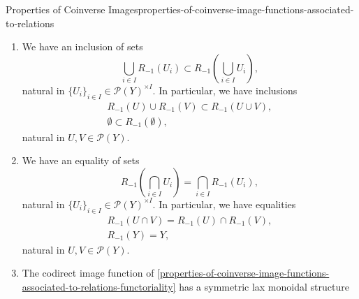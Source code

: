 \begin{proposition}{Properties of Coinverse Images}{properties-of-coinverse-image-functions-associated-to-relations}
\begin{enumerate}
            witnessed by a bijections of sets
            \[%
                \Hom_{\mathcal{P}(X)}(R_{!}(U),V)%
                \cong%
                \Hom_{\mathcal{P}(X)}(U,R_{-1}(V)),%
            \]%
            natural in $U\in\mathcal{P}(X)$ and $V\in\mathcal{P}(Y)$, i.e.\ such that:
            \begin{itemize}
                \itemstar The following conditions are equivalent:
                    \begin{itemize}
                        \item We have $R_{!}(U)\subset V$.
                        \item We have $U\subset R_{-1}(V)$.
                    \end{itemize}
            \end{itemize}
        \item\label{properties-of-coinverse-image-functions-associated-to-relations-lax-preservation-of-colimits}We have an inclusion of sets
            \[
                \bigcup_{i\in I}R_{-1}(U_{i})%
                \subset%
                R_{-1}(\bigcup_{i\in I}U_{i}),%
            \]%
            natural in $\{U_{i}\}_{i\in I}\in\mathcal{P}(Y)^{\times I}$. In particular, we have inclusions%
            \[
                \begin{gathered}
                    R_{-1}(U)\cup R_{-1}(V) \subset R_{-1}(U\cup V),\\
                    \emptyset               \subset R_{-1}(\emptyset),
                \end{gathered}
            \]%
            natural in $U,V\in\mathcal{P}(Y)$.
        \item\label{properties-of-coinverse-image-functions-associated-to-relations-preservation-of-limits}We have an equality of sets
            \[
                    R_{-1}(\bigcap_{i\in I}U_{i})%
                    =%
                    \bigcap_{i\in I}R_{-1}(U_{i}),%
            \]%
            natural in $\{U_{i}\}_{i\in I}\in\mathcal{P}(Y)^{\times I}$. In particular, we have equalities%
            \[
                \begin{gathered}
                    R_{-1}(U\cap V) = R_{-1}(U)\cap R_{-1}(V),\\
                    R_{-1}(Y)       = Y,
                \end{gathered}
            \]%
            natural in $U,V\in\mathcal{P}(Y)$.
        \item\label{properties-of-coinverse-image-functions-associated-to-relations-symmetric-lax-monoidality-with-respect-to-unions}The codirect image function of \cref{properties-of-coinverse-image-functions-associated-to-relations-functoriality} has a symmetric lax monoidal structure

\end{enumerate}
\end{proposition}
